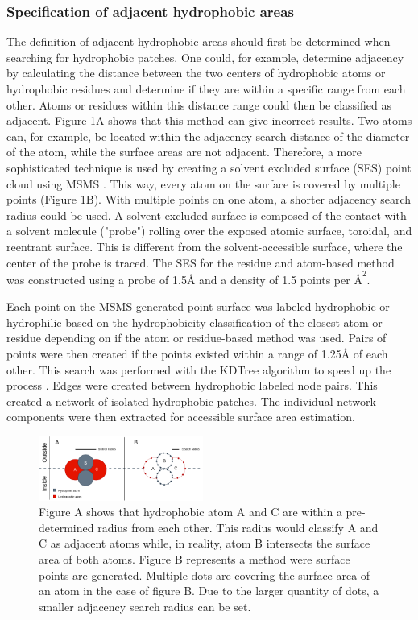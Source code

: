 \documentclass[11pt,a4paper]{article}
\begin{document}
\subsubsection{Specification of adjacent hydrophobic areas}
 The definition of adjacent hydrophobic areas should first be determined when searching for hydrophobic patches. One could, for example, determine adjacency by calculating the distance between the two centers of hydrophobic atoms or hydrophobic residues and determine if they are within a specific range from each other. Atoms or residues within this distance range could then be classified as adjacent. Figure \ref{fig2}A shows that this method can give incorrect results. Two atoms can, for example, be located within the adjacency search distance of the diameter of the atom, while the surface areas are not adjacent. Therefore, a more sophisticated technique is used by creating a solvent excluded surface (SES) point cloud using MSMS  \cite{sanner1996reduced}. This way, every atom on the surface is covered by multiple points (Figure \ref{fig2}B). With multiple points on one atom, a shorter adjacency search radius could be used. A solvent excluded surface is composed of the contact with a solvent molecule ("probe") rolling over the exposed atomic surface, toroidal, and reentrant surface. This is different from the solvent-accessible surface, where the center of the probe is traced. The SES for the residue and atom-based method was constructed using a probe of 1.5\si{\angstrom} and a density of 1.5 points per $\si{\angstrom}^2$.

Each point on the MSMS generated point surface was labeled hydrophobic or hydrophilic based on the hydrophobicity classification of the closest atom or residue depending on if the atom or residue-based method was used. Pairs of points were then created if the points existed within a range of 1.25\si{\angstrom} of each other. This search was performed with the KDTree algorithm to speed up the process \cite{bentley1975multidimensional}. Edges were created between hydrophobic labeled node pairs. This created a network of isolated hydrophobic patches. The individual network components were then extracted for accessible surface area estimation.

\begin{figure}[h!]
  \centering
  \includegraphics[width=0.48\textwidth]{figures/fig2.png}
  \caption{Figure A shows that hydrophobic atom A and C are within a pre-determined radius from each other. This radius would classify A and C as adjacent atoms while, in reality, atom B intersects the surface area of both atoms. Figure B represents a method were surface points are generated. Multiple dots are covering the surface area of an atom in the case of figure B. Due to the larger quantity of dots, a smaller adjacency search radius can be set.}
  \label{fig2}
\end{figure}
\end{document}
